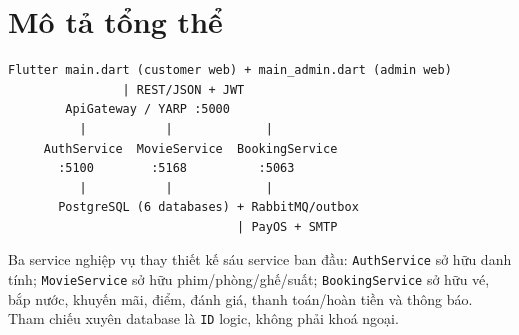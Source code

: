 \clearpage
\section{Mô tả tổng thể}\label{sec:srs-4}
\begin{Verbatim}
Flutter main.dart (customer web) + main_admin.dart (admin web)
                | REST/JSON + JWT
        ApiGateway / YARP :5000
          |           |             |
     AuthService  MovieService  BookingService
       :5100        :5168          :5063
          |           |             |
       PostgreSQL (6 databases) + RabbitMQ/outbox
                                | PayOS + SMTP
\end{Verbatim}
Ba service nghiệp vụ thay thiết kế sáu service ban đầu: \texttt{Auth\allowbreak{}Service} sở hữu danh tính; \texttt{Movie\allowbreak{}Service} sở hữu phim/\allowbreak{}phòng/\allowbreak{}ghế/\allowbreak{}suất; \texttt{Booking\allowbreak{}Service} sở hữu vé, bắp nước, khuyến mãi, điểm, đánh giá, thanh toán/\allowbreak{}hoàn tiền và thông báo. Tham chiếu xuyên database là \texttt{ID} logic, không phải khoá ngoại.
